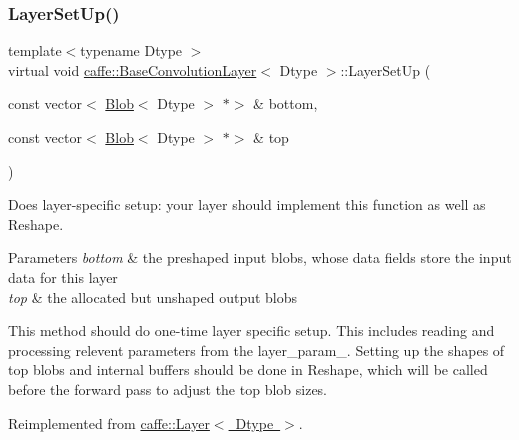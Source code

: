 \subsubsection{\texorpdfstring{Layer\+Set\+Up()}{LayerSetUp()}\hspace{0.1cm}{\footnotesize\ttfamily [2/2]}}
{\footnotesize\ttfamily template$<$typename Dtype $>$ \\
virtual void \mbox{\hyperlink{classcaffe_1_1_base_convolution_layer}{caffe\+::\+Base\+Convolution\+Layer}}$<$ Dtype $>$\+::Layer\+Set\+Up (\begin{DoxyParamCaption}\item[{const vector$<$ \mbox{\hyperlink{classcaffe_1_1_blob}{Blob}}$<$ Dtype $>$ $\ast$$>$ \&}]{bottom,  }\item[{const vector$<$ \mbox{\hyperlink{classcaffe_1_1_blob}{Blob}}$<$ Dtype $>$ $\ast$$>$ \&}]{top }\end{DoxyParamCaption})\hspace{0.3cm}{\ttfamily [virtual]}}



Does layer-\/specific setup\+: your layer should implement this function as well as Reshape. 


\begin{DoxyParams}{Parameters}
{\em bottom} & the preshaped input blobs, whose data fields store the input data for this layer \\
\hline
{\em top} & the allocated but unshaped output blobs\\
\hline
\end{DoxyParams}
This method should do one-\/time layer specific setup. This includes reading and processing relevent parameters from the {\ttfamily layer\+\_\+param\+\_\+}. Setting up the shapes of top blobs and internal buffers should be done in {\ttfamily Reshape}, which will be called before the forward pass to adjust the top blob sizes. 

Reimplemented from \mbox{\hyperlink{classcaffe_1_1_layer_a481323a3e0972c682787f2137468c29f}{caffe\+::\+Layer$<$ Dtype $>$}}.

\mbox{\label{classcaffe_1_1_base_convolution_layer_aa3d861ed15f6e41c6257d6a10defa7eb}} 
